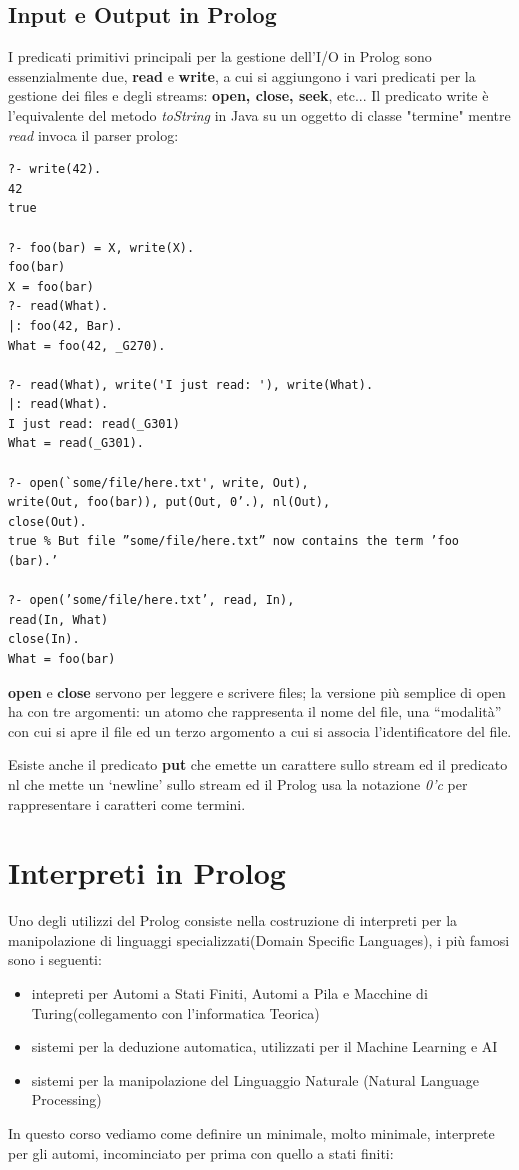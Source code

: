 \subsection{Input e Output in Prolog}
I predicati primitivi principali per la gestione dell'I/O in Prolog sono essenzialmente due, \textbf{read} e \textbf{write},
a cui si aggiungono i vari predicati per la gestione dei files e degli streams: \textbf{open, close, seek}, etc...
Il predicato write è l'equivalente del metodo \emph{toString} in Java su un oggetto di classe "termine" mentre \emph{read} invoca il parser prolog:
\begin{shaded}
\begin{verbatim}
?- write(42).
42
true

?- foo(bar) = X, write(X).
foo(bar)
X = foo(bar)
?- read(What).
|: foo(42, Bar).
What = foo(42, _G270).

?- read(What), write('I just read: '), write(What).
|: read(What).
I just read: read(_G301)
What = read(_G301).

?- open(`some/file/here.txt', write, Out),
write(Out, foo(bar)), put(Out, 0’.), nl(Out),
close(Out).
true % But file ”some/file/here.txt” now contains the term ’foo
(bar).’

?- open(’some/file/here.txt’, read, In),
read(In, What)
close(In).
What = foo(bar)
\end{verbatim}
\end{shaded}
\textbf{open} e \textbf{close} servono per leggere e scrivere files; la versione più semplice di open ha con tre argomenti:
un atomo che rappresenta il nome del file, una “modalità” con cui si apre il file ed un terzo argomento a cui si associa l’identificatore del file.

Esiste anche il predicato \textbf{put} che emette un carattere sullo stream ed il predicato nl che mette un ‘newline’ sullo stream
ed il Prolog usa la notazione \textit{0'c} per rappresentare i caratteri come termini.
\section{Interpreti in Prolog}
Uno degli utilizzi del Prolog consiste nella costruzione di interpreti per la manipolazione di linguaggi specializzati(Domain Specific Languages),
i più famosi sono i seguenti:
\begin{itemize}
\item intepreti per Automi a Stati Finiti, Automi a Pila e  Macchine di Turing(collegamento con l'informatica Teorica)
\item sistemi per la deduzione automatica, utilizzati per il Machine Learning e AI
\item sistemi per la manipolazione del Linguaggio Naturale (Natural Language Processing)
\end{itemize}
In questo corso vediamo come definire un minimale, molto minimale, interprete per gli automi, incominciato per prima con quello a stati finiti:

